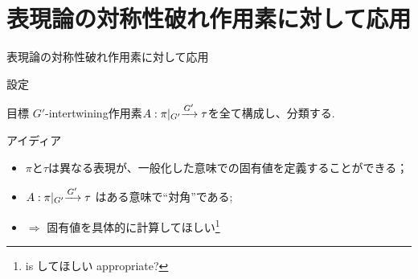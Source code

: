 \documentclass[pdf,notes]{beamer}
\renewcommand{\implies}{\Rightarrow}
\begin{document}
\section{表現論の対称性破れ作用素に対して応用}
\newcommand{\mysbo}{A:\pi\kern-0.1cm\mid_{G'}\xrightarrow{G'}\tau}
{
	\begin{frame}{表現論の対称性破れ作用素に対して応用}
	\begin{block}{設定}
		
	\centerline{
		\xymatrixcolsep{0.5pc}
		\xymatrixrowsep{1pc}
		}
	\end{block}
	\hspace{1cm}
	\vspace{-0.5cm}
	\begin{block}{目標}
		$G'$-intertwining作用素$\mysbo$を全て構成し、分類する.
	\end{block}
\end{frame}
\begin{frame}{アイディア}
	\begin{itemize}%
		\item $\pi$と$\tau$は異なる表現が、一般化した意味での固有値を定義することができる；
		\item $\mysbo$ はある意味で``対角''である;
		\item $\implies$ 固有値を具体的に計算してほしい\footnote{is してほしい appropriate?}
	\end{itemize}
\end{frame}
}
\end{document}
